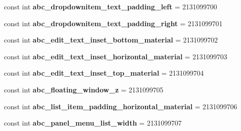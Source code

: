 \begin{DoxyCompactItemize}
const int {\bfseries abc\+\_\+dropdownitem\+\_\+text\+\_\+padding\+\_\+left} = 2131099700
\item 
\mbox{\label{class_pinned_app_1_1_droid_1_1_resource_1_1_dimension_a237a5a4752ce2d427558c2760a7449b3}} 
const int {\bfseries abc\+\_\+dropdownitem\+\_\+text\+\_\+padding\+\_\+right} = 2131099701
\item 
\mbox{\label{class_pinned_app_1_1_droid_1_1_resource_1_1_dimension_a237ba8f7dd27db6796e203abb099e947}} 
const int {\bfseries abc\+\_\+edit\+\_\+text\+\_\+inset\+\_\+bottom\+\_\+material} = 2131099702
\item 
\mbox{\label{class_pinned_app_1_1_droid_1_1_resource_1_1_dimension_afc25964d67efa1fdf1e8f72ada0a421e}} 
const int {\bfseries abc\+\_\+edit\+\_\+text\+\_\+inset\+\_\+horizontal\+\_\+material} = 2131099703
\item 
\mbox{\label{class_pinned_app_1_1_droid_1_1_resource_1_1_dimension_a3ad63167bc5a95c7c07027661b5a5bac}} 
const int {\bfseries abc\+\_\+edit\+\_\+text\+\_\+inset\+\_\+top\+\_\+material} = 2131099704
\item 
\mbox{\label{class_pinned_app_1_1_droid_1_1_resource_1_1_dimension_a5961c34cac572c103607ba4018de9fb9}} 
const int {\bfseries abc\+\_\+floating\+\_\+window\+\_\+z} = 2131099705
\item 
\mbox{\label{class_pinned_app_1_1_droid_1_1_resource_1_1_dimension_aa5881f1302fb550718a1273cb93ecaf7}} 
const int {\bfseries abc\+\_\+list\+\_\+item\+\_\+padding\+\_\+horizontal\+\_\+material} = 2131099706
\item 
\mbox{\label{class_pinned_app_1_1_droid_1_1_resource_1_1_dimension_a11456e3e5fddf65f9ddfdaef93ec599e}} 
const int {\bfseries abc\+\_\+panel\+\_\+menu\+\_\+list\+\_\+width} = 2131099707
\item 
\mbox{\label{class_pinned_app_1_1_droid_1_1_resource_1_1_dimension_ac639ca0ea10e421e915dbf6dce8230c8}} 

\end{DoxyCompactItemize}

